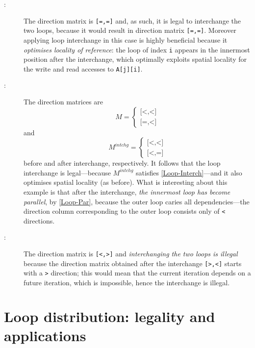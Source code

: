 \begin{description}
\item[:] The direction matrix is
  \texttt{[=,=]} and, as such, it is legal to interchange the two
  loops, because it would result in direction matrix
  \texttt{[=,=]}. Moreover applying loop interchange in this case is
  highly beneficial because it \emph{optimises locality of reference}:
  the loop of index \texttt{i} appears in the innermost position after
  the interchange, which optimally exploits spatial locality for the
  write and read accesses to \texttt{A[j][i]}.

\item[:] The direction matrices are
  \[
    M
    = \begin{cases}\texttt{[<,<]}\\\texttt{[=,<]}\end{cases}
  \]
  and
  \[
    M^{intchg}
    = \begin{cases}\texttt{[<,<]}\\\texttt{[<,=]}\end{cases}
  \]
  before and after interchange, respectively.  It follows that the
  loop interchange is legal---because $M^{intchg}$ satisfies
  \cref{Loop-Interch}---and it also optimises spatial locality (as
  before).  What is interesting about this example is that after the
  interchange, \emph{the innermost loop has become parallel}, by
  \cref{Loop-Par}, because the outer loop caries all
  dependencies---the direction column corresponding to the outer loop
  consists only of \texttt{<} directions.

\item[:] The direction matrix is
  \texttt{[<,>]} and \emph{interchanging the two loops is illegal}
  because the direction matrix obtained after the interchange
  \texttt{[>,<]} starts with a \texttt{>} direction; this would mean
  that the current iteration depends on a future iteration, which is
  impossible, hence the interchange is illegal.
\end{description}

\section{Loop distribution: legality and applications}
\label{sec:loop-distrib}

